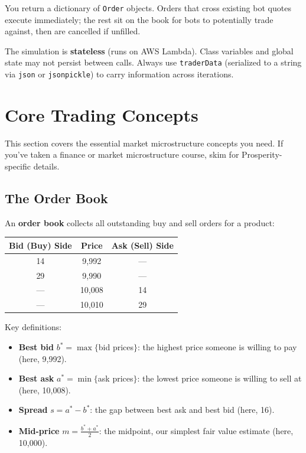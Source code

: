 \documentclass[11pt, letterpaper]{article}
\begin{document}
You return a dictionary of \texttt{Order} objects. Orders that cross existing bot quotes execute immediately; the rest sit on the book for bots to potentially trade against, then are cancelled if unfilled.

\begin{keyinsight}
The simulation is \textbf{stateless} (runs on AWS Lambda). Class variables and global state may not persist between calls. Always use \texttt{traderData} (serialized to a string via \texttt{json} or \texttt{jsonpickle}) to carry information across iterations.
\end{keyinsight}


\section{Core Trading Concepts}

This section covers the essential market microstructure concepts you need. If you've taken a finance or market microstructure course, skim for Prosperity-specific details.

\subsection{The Order Book}

An \textbf{order book} collects all outstanding buy and sell orders for a product:

\begin{center}
\begin{tabular}{ccc}
\toprule
\textbf{Bid (Buy) Side} & \textbf{Price} & \textbf{Ask (Sell) Side} \\
\midrule
14 & 9{,}992 & --- \\
29 & 9{,}990 & --- \\
--- & 10{,}008 & 14 \\
--- & 10{,}010 & 29 \\
\bottomrule
\end{tabular}
\end{center}

Key definitions:
\begin{itemize}
    \item \textbf{Best bid} $b^* = \max\{$bid prices$\}$: the highest price someone is willing to pay (here, 9{,}992).
    \item \textbf{Best ask} $a^* = \min\{$ask prices$\}$: the lowest price someone is willing to sell at (here, 10{,}008).
    \item \textbf{Spread} $s = a^* - b^*$: the gap between best ask and best bid (here, 16).
    \item \textbf{Mid-price} $m = \frac{b^* + a^*}{2}$: the midpoint, our simplest fair value estimate (here, 10{,}000).
\end{itemize}
\end{document}
